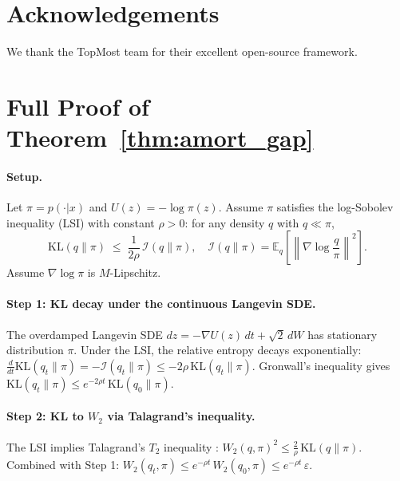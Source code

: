 \documentclass[10pt]{article}
\newcommand{\E}{\mathbb{E}}
\begin{document}
\section*{Acknowledgements}

We thank the TopMost team for their excellent open-source framework.




\appendix

\section{Full Proof of Theorem~\ref{thm:amort_gap}}
\label{app:proof}

\paragraph{Setup.}
Let $\pi = p(\cdot|x)$ and $U(z) = -\log\pi(z)$.
Assume $\pi$ satisfies the log-Sobolev inequality (LSI) with constant $\rho > 0$:
for any density $q$ with $q \ll \pi$,
\[
    \mathrm{KL}(q\|\pi) \;\le\; \frac{1}{2\rho}\,\mathcal{I}(q\|\pi),
    \quad \mathcal{I}(q\|\pi) = \E_q\!\left[\left\|\nabla\log\frac{q}{\pi}\right\|^2\right].
\]
Assume $\nabla \log\pi$ is $M$-Lipschitz.

\paragraph{Step 1: KL decay under the continuous Langevin SDE.}
The overdamped Langevin SDE $dz = -\nabla U(z)\,dt + \sqrt{2}\,dW$ has stationary
distribution $\pi$. Under the LSI, the relative entropy decays exponentially:
$\frac{d}{dt}\mathrm{KL}(q_t\|\pi) = -\mathcal{I}(q_t\|\pi) \le -2\rho\,\mathrm{KL}(q_t\|\pi)$.
Gronwall's inequality gives $\mathrm{KL}(q_t\|\pi) \le e^{-2\rho t}\,\mathrm{KL}(q_0\|\pi)$.

\paragraph{Step 2: KL to $W_2$ via Talagrand's inequality.}
The LSI implies Talagrand's $T_2$ inequality \citep{otto2000generalization}:
$W_2(q,\pi)^2 \le \frac{2}{\rho}\,\mathrm{KL}(q\|\pi)$. Combined with Step 1:
$W_2(q_t,\pi) \le e^{-\rho t}\,W_2(q_0,\pi) \le e^{-\rho t}\,\varepsilon$.
\end{document}
